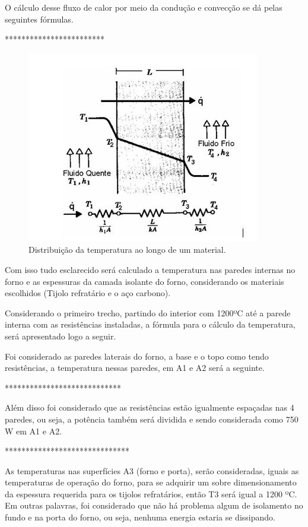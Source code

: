 O cálculo desse fluxo de calor por meio da condução e convecção se dá pelas seguintes fórmulas.


************************



\begin{figure}[h]
	\centering
	\label{dist_temperatura}
	\includegraphics[keepaspectratio=true,scale=1.0]{figuras/dist_temperatura.JPG}
	\caption{Distribuição da temperatura ao longo de um material.}
\end{figure}

Com isso tudo esclarecido será calculado a temperatura nas paredes internas no forno e as espessuras da camada isolante do forno, considerando os materiais escolhidos (Tijolo refratário e o aço carbono).

Considerando o primeiro trecho, partindo do interior com 1200ºC até a parede interna com as resistências instaladas, a fórmula para o cálculo da temperatura, será apresentado logo a seguir.

Foi considerado as paredes laterais do forno, a base e o topo como tendo resistências, a temperatura nessas paredes, em A1 e A2 será a seguinte.



****************************



Além disso foi considerado que as resistências estão igualmente espaçadas nas 4 paredes, ou seja, a potência também será dividida e sendo considerada como 750 W em A1 e A2.


******************************


As temperaturas nas superfícies A3 (forno e porta), serão consideradas, iguais as temperaturas de operação do forno, para se adquirir um sobre dimensionamento da espessura requerida para os tijolos refratários, então T3 será igual a 1200 ºC. Em outras palavras, foi considerado que não há problema algum de isolamento no fundo e na porta do forno, ou seja, nenhuma energia estaria se dissipando.

